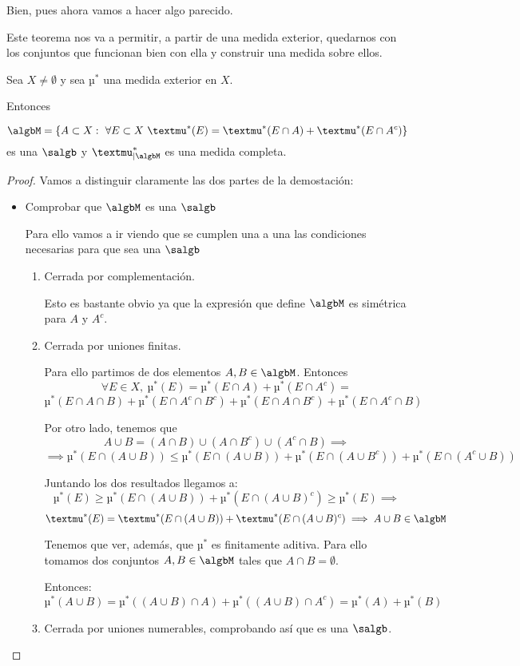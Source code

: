 \documentclass{apuntes}
\begin{document}
Bien, pues ahora vamos a hacer algo parecido.
\begin{theorem}
Este teorema nos va a permitir, a partir de una medida exterior, quedarnos con los conjuntos que funcionan bien con ella y construir una medida sobre ellos.

Sea $X \neq \emptyset$ y sea $µ^*$ una medida exterior en $X$.

Entonces

\[\algbM = \{A \subset X: \ \forall E \subset X \ µ^*(E)=µ^*(E \cap A) + µ^*(E \cap A^c)\}\]
es una $\salgb$ y $µ^*_{|\algbM}$ es una medida completa.
\end{theorem}
\begin{proof}
Vamos a distinguir claramente las dos partes de la demostación:
\begin{itemize}
\item Comprobar que $\algbM$ es una $\salgb$

Para ello vamos a ir viendo que se cumplen una a una las condiciones necesarias para que sea una $\salgb$
\begin{enumerate}
\item Cerrada por complementación.

Esto es bastante obvio ya que la expresión que define $\algbM$ es simétrica para $A$ y $A^c$.

\item Cerrada por uniones finitas.

Para ello partimos de dos elementos $A,B\in \algbM$. Entonces
\[\forall E \in X, \ µ^*(E)=µ^*(E \cap A)+µ^*(E \cap A^c) = \]
\[µ^*(E \cap A\cap B)+µ^*(E \cap A^c \cap B^c)+µ^*(E \cap A \cap B^c)+µ^*(E \cap A^c \cap B)\]

Por otro lado, tenemos que
\[A \cup B = (A\cap B)\cup(A\cap B^c)\cup (A^c \cap B) \implies\]
\[\implies µ^*(E\cap (A\cup B)) \leq µ^*(E \cap (A \cup B))+µ^*(E \cap (A \cup B^c))+µ^*(E \cap (A^c \cup B))\]

Juntando los dos resultados llegamos a:
\[µ^*(E) \geq µ^*(E \cap (A \cup B))+µ^*(E \cap (A \cup B)^c)\geq µ^*(E) \implies\]
\[µ^*(E) = µ^*(E \cap (A \cup B))+µ^*(E \cap (A \cup B)^c) \implies  A \cup B \in \algbM\]


Tenemos que ver, además, que $µ^*$ es finitamente aditiva. Para ello tomamos dos conjuntos $A, B \in \algbM$ tales que $A \cap B = \emptyset$.

Entonces:
\[µ^*(A \cup B) = µ^*((A \cup B) \cap A) + µ^*((A \cup B) \cap A^c)= µ^*(A)+µ^*(B)\]

\item Cerrada por uniones numerables, comprobando así que es una $\salgb$.


\end{enumerate}
\end{itemize}
\end{proof}
\end{document}

